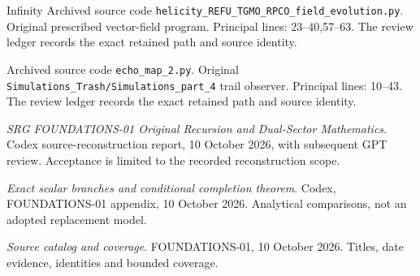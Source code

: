 \documentclass[11pt,a4paper]{article}
\theoremstyle{definition}
\numberwithin{equation}{section}
\begin{document}
\begin{thebibliography}{Infinity}
Archived source code \texttt{helicity\_REFU\_TGMO\_RPCO\_field\_evolution.py}.
Original prescribed vector-field program. Principal lines: 23--40,57--63.
The review ledger records the exact retained path and source identity.

Archived source code \texttt{echo\_map\_2.py}.
Original \texttt{Simulations\_Trash/Simulations\_part\_4} trail observer. Principal lines: 10--43.
The review ledger records the exact retained path and source identity.

\emph{SRG FOUNDATIONS-01 Original Recursion and Dual-Sector Mathematics}.
Codex source-reconstruction report, 10 October 2026, with subsequent GPT review.
Acceptance is limited to the recorded reconstruction scope.

\emph{Exact scalar branches and conditional completion theorem}.
Codex, FOUNDATIONS-01 appendix, 10 October 2026.
Analytical comparisons, not an adopted replacement model.

\emph{Source catalog and coverage}.
FOUNDATIONS-01, 10 October 2026. Titles, date evidence, identities and bounded coverage.

\end{thebibliography}
\end{document}
